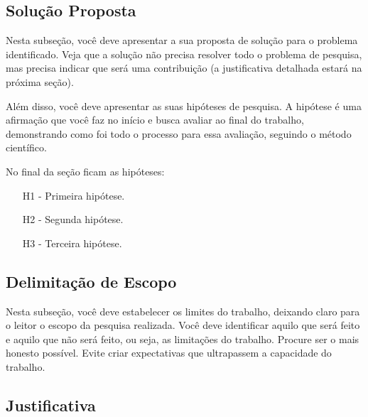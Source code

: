 \subsection{Solução Proposta}
\label{ss_cintro_solucao}

Nesta subseção, você deve apresentar a sua proposta de solução para o problema identificado. Veja que a solução não precisa resolver todo o problema de pesquisa, mas precisa indicar que será uma contribuição (a justificativa detalhada estará na próxima seção).

Além disso, você deve apresentar as suas hipóteses de pesquisa. A hipótese é uma afirmação que você faz no início e busca avaliar ao final do trabalho, demonstrando como foi todo o processo para essa avaliação, seguindo o método científico.

No final da seção ficam as hipóteses:

\begin{itemize}
    \item[H1 -] Primeira hipótese.
    
    \item[H2 -] Segunda hipótese.
    
    \item[H3 -] Terceira hipótese.
\end{itemize}





\subsection{Delimitação de Escopo}
\label{ss_cintro_escopo}

Nesta subseção, você deve estabelecer os limites do trabalho, deixando claro para o leitor o escopo da pesquisa realizada. Você deve identificar aquilo que será feito e aquilo que não será feito, ou seja, as limitações do trabalho. Procure ser o mais honesto possível. Evite criar expectativas que ultrapassem a capacidade do trabalho.



\subsection{Justificativa}
\label{ss_cintro_justificativa}

